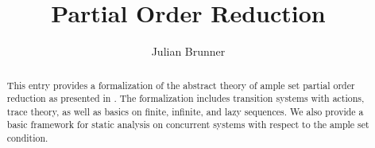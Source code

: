 \documentclass[11pt, a4paper]{article}
\begin{document}
\title{Partial Order Reduction}
\author{Julian Brunner}

\maketitle

\begin{abstract}
	This entry provides a formalization of the abstract theory of ample set partial order reduction as presented in \cite{partial_order_reduction_ample_set_on-the-fly, partial_order_reduction_ample_set_verification_abstract}.
	The formalization includes transition systems with actions, trace theory, as well as basics on finite, infinite, and lazy sequences.
	We also provide a basic framework for static analysis on concurrent systems with respect to the ample set condition.
\end{abstract}

\tableofcontents





\end{document}
